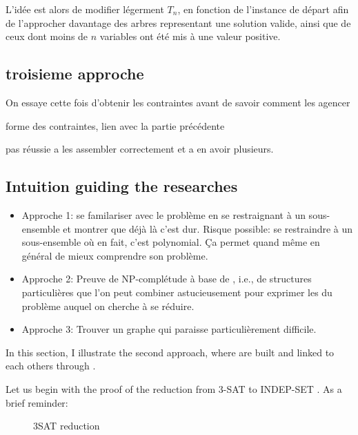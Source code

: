 L'idée est alors de modifier légerment $T_{n}$, en fonction de
l'instance de départ afin de l'approcher davantage des arbres
representant une solution valide, ainsi que de ceux dont moins de $n$
variables ont été mis à une valeur positive. 
\subsection{troisieme approche}
On essaye cette fois d'obtenir les contraintes avant de savoir comment
les agencer

forme des contraintes, lien avec la partie précédente

pas réussie a les assembler correctement et a en avoir plusieurs.

\subsection{Intuition guiding the researches}

\begin{itemize}
\item Approche 1: se familariser avec le problème en se restraignant à
  un sous-ensemble et montrer que déjà là c'est dur. Risque possible:
  se restraindre à un sous-ensemble où en fait, c'est polynomial. Ça
  permet quand même en général de mieux comprendre son problème.
\item Approche 2: Preuve de NP-complétude à base de \widget,
  i.e., de structures particulières que l'on peut combiner
  astucieusement pour exprimer les \constraint du problème
  auquel on cherche à se réduire.
\item Approche 3: Trouver un graphe qui paraisse particulièrement
  difficile.
\end{itemize}

In this section, I illustrate the second approach, where \widgets
are built and linked to each others through \constraints. 

Let us begin with the proof of the reduction from 3-SAT to INDEP-SET
\cite{polytech}. As a brief reminder:
\begin{definition}[3-SAT]
  
\end{definition}

\begin{definition}
  
\end{definition}
\begin{figure}

  \centering
  
  \caption{3SAT reduction}
  \label{fig:3sat}
\end{figure}

